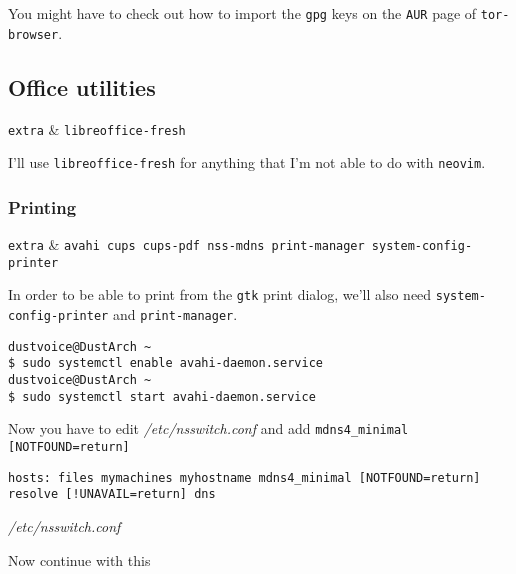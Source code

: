 \documentclass[10pt]{dustdoc}
\begin{document}
\begin{NOTE}
    You might have to check out how to import the \texttt{gpg} keys on the \texttt{AUR} page of \texttt{tor-browser}.
\end{NOTE}

\subsection{Office utilities}
\label{sec:office-utilities}

\begin{packagetable}
    \texttt{extra} & \texttt{libreoffice-fresh} \\
\end{packagetable}

I’ll use \texttt{libreoffice-fresh} for anything that I’m not able to do with \texttt{neovim}.

\subsubsection{Printing}
\label{sec:printing}

\begin{packagetable}
    \texttt{extra} & \texttt{avahi cups cups-pdf nss-mdns print-manager system-config-printer} \\
\end{packagetable}

In order to be able to print from the \texttt{gtk} print dialog, we’ll also need \texttt{system-config-printer} and \texttt{print-manager}.

\begin{verbatim}
dustvoice@DustArch ~
$ sudo systemctl enable avahi-daemon.service
dustvoice@DustArch ~
$ sudo systemctl start avahi-daemon.service
\end{verbatim}

Now you have to edit \textit{/etc/nsswitch.conf} and add\newline
\texttt{mdns4\_minimal [NOTFOUND=return]}

\begin{mintedlisting}
    \begin{verbatim}
hosts: files mymachines myhostname mdns4_minimal [NOTFOUND=return] resolve [!UNAVAIL=return] dns
    \end{verbatim}

    \caption{\textit{/etc/nsswitch.conf}}
\end{mintedlisting}

Now continue with this
\end{document}
